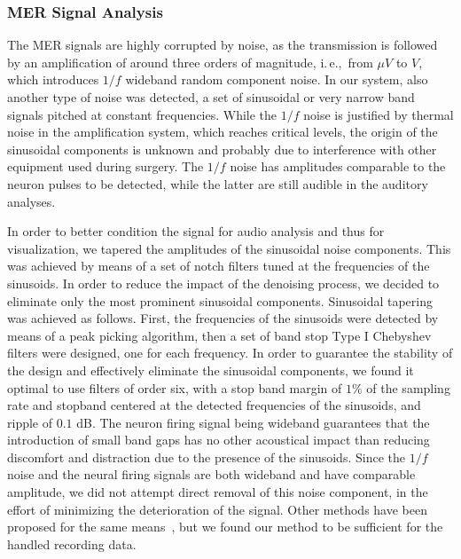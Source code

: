 \documentclass[journal]{vgtc}                %
\begin{document}
\subsubsection{MER Signal Analysis}\label{sec:overview:recording:signalanalysis}
The MER signals are highly corrupted by noise, as the transmission is followed by an amplification of around three orders of magnitude, i.\,e.,~from $\mu V$ to $V$, which introduces $1/f$ wideband random component noise. In our system, also another type of noise was detected, a set of sinusoidal or very narrow band signals pitched at constant frequencies. While the $1/f$ noise is justified by thermal noise in the amplification system, which reaches critical levels, the origin of the sinusoidal components is unknown and probably due to interference with other equipment used during surgery. The $1/f$ noise has amplitudes comparable to the neuron pulses to be detected, while the latter are still audible in the auditory analyses.

In order to better condition the signal for audio analysis and thus for visualization, we tapered the amplitudes of the sinusoidal noise components. This was achieved by means of a set of notch filters tuned at the frequencies of the sinusoids. In order to reduce the impact of the denoising process, we decided to eliminate only the most prominent sinusoidal components. Sinusoidal tapering was achieved as follows. First, the frequencies of the sinusoids were detected by means of a peak picking algorithm, then a set of band stop Type I Chebyshev filters were designed, one for each frequency. In order to guarantee the stability of the design and effectively eliminate the sinusoidal components, we found it optimal to use filters of order six, with a stop band margin of $1\%$ of the sampling rate and stopband centered at the detected frequencies of the sinusoids, and ripple of $0.1$ dB. The neuron firing signal being wideband guarantees that the introduction of small band gaps has no other acoustical impact than reducing discomfort and distraction due to the presence of the sinusoids. Since the $1/f$ noise and the neural firing signals are both wideband and have comparable amplitude, we did not attempt direct removal of this noise component, in the effort of minimizing the deterioration of the signal. Other methods have been proposed for the same means~\cite{Jansen,Donoho1995}, but we found our method to be sufficient for the handled recording data.
\end{document}
